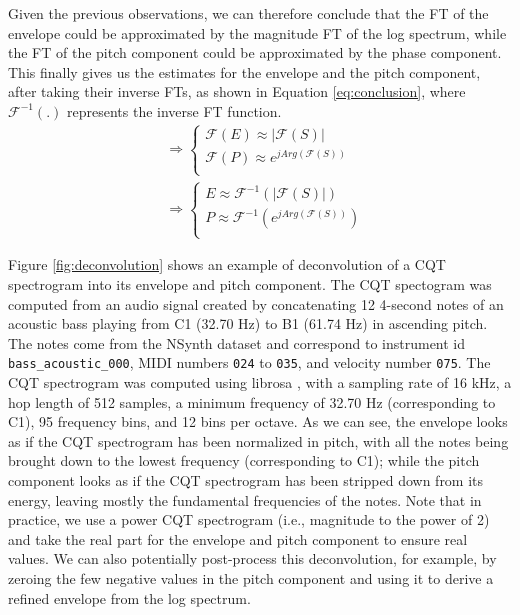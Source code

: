 \documentclass[journal]{IEEEtran}
\begin{document}
Given the previous observations, we can therefore conclude that the FT of the envelope could be approximated by the magnitude FT of the log spectrum, while the FT of the pitch component could be approximated by the phase component. This finally gives us the estimates for the envelope and the pitch component, after taking their inverse FTs, as shown in Equation \ref{eq:conclusion}, where $\mathcal{F}^{-1}(.)$ represents the inverse FT function.
\begin{equation}
\label{eq:conclusion}
\begin{split}
& \Rightarrow 
\begin{cases}
\mathcal{F}(E) \approx |\mathcal{F}(S)| \\
\mathcal{F}(P) \approx e^{j Arg(\mathcal{F}(S))} \\
\end{cases} \\
& \Rightarrow
\begin{cases}
E \approx \mathcal{F}^{-1}(|\mathcal{F}(S)|) \\
P \approx \mathcal{F}^{-1}(e^{j Arg(\mathcal{F}(S))}) \\
\end{cases}
\end{split}
\end{equation}

Figure \ref{fig:deconvolution} shows an example of deconvolution of a CQT spectrogram into its envelope and pitch component. The CQT spectogram was computed from an audio signal created by concatenating 12 4-second notes of an acoustic bass playing from C1 (32.70 Hz) to B1 (61.74 Hz) in ascending pitch. The notes come from the NSynth dataset \cite{engel2017} and correspond to instrument id \texttt{bass\_acoustic\_000}, MIDI numbers \texttt{024} to \texttt{035}, and velocity number \texttt{075}. The CQT spectrogram was computed using librosa \cite{mcfee2015, schoerkhuber2010}, with a sampling rate of 16 kHz, a hop length of 512 samples, a minimum frequency of 32.70 Hz (corresponding to C1), 95 frequency bins, and 12 bins per octave. As we can see, the envelope looks as if the CQT spectrogram has been normalized in pitch, with all the notes being brought down to the lowest frequency (corresponding to C1); while the pitch component looks as if the CQT spectrogram has been stripped down from its energy, leaving mostly the fundamental frequencies of the notes. Note that in practice, we use a power CQT spectrogram (i.e., magnitude to the power of 2) and take the real part for the envelope and pitch component to ensure real values. We can also potentially post-process this deconvolution, for example, by zeroing the few negative values in the pitch component and using it to derive a refined  envelope from the log spectrum.
\end{document}
